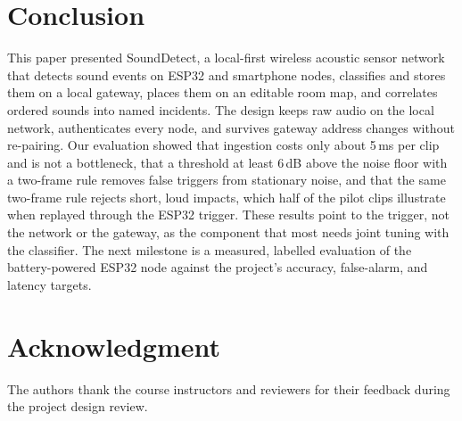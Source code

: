 \documentclass[conference]{IEEEtran}
\newcommand{\ms}{\,ms}
\begin{document}
\section{Conclusion}
\label{sec:conclusion}
This paper presented SoundDetect, a local-first wireless acoustic sensor network that detects sound events on ESP32 and smartphone nodes, classifies and stores them on a local gateway, places them on an editable room map, and correlates ordered sounds into named incidents. The design keeps raw audio on the local network, authenticates every node, and survives gateway address changes without re-pairing. Our evaluation showed that ingestion costs only about 5\ms{} per clip and is not a bottleneck, that a threshold at least 6\,dB above the noise floor with a two-frame rule removes false triggers from stationary noise, and that the same two-frame rule rejects short, loud impacts, which half of the pilot clips illustrate when replayed through the ESP32 trigger. These results point to the trigger, not the network or the gateway, as the component that most needs joint tuning with the classifier. The next milestone is a measured, labelled evaluation of the battery-powered ESP32 node against the project's accuracy, false-alarm, and latency targets.

\section*{Acknowledgment}
The authors thank the course instructors and reviewers for their feedback during the project design review.
\end{document}
